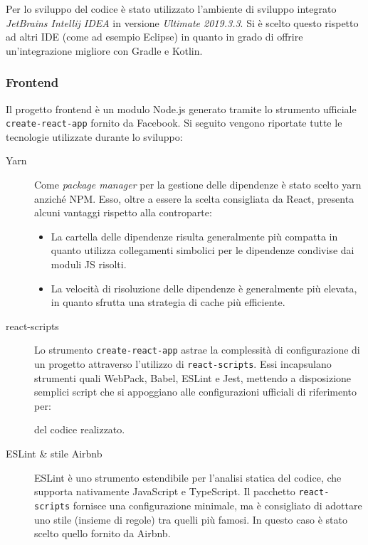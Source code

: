       Per lo sviluppo del codice è stato utilizzato l'ambiente di sviluppo integrato \emph{JetBrains Intellij IDEA} in versione \emph{Ultimate 2019.3.3}.
      Si è scelto questo rispetto ad altri IDE (come ad esempio Eclipse) in quanto in grado di offrire un'integrazione migliore con Gradle e Kotlin.

    \subsubsection{Frontend}

      Il progetto frontend è un modulo Node.js generato tramite lo strumento ufficiale \texttt{create-react-app} fornito da Facebook.
      Si seguito vengono riportate tutte le tecnologie utilizzate durante lo sviluppo:

      \begin{description}
        \item[Yarn]
          Come \emph{package manager} per la gestione delle dipendenze è stato scelto yarn anziché NPM\@.
          Esso, oltre a essere la scelta consigliata da React, presenta alcuni vantaggi rispetto alla controparte:
          \begin{itemize}
            \item La cartella delle dipendenze risulta generalmente più compatta in quanto utilizza collegamenti simbolici per le dipendenze condivise dai moduli JS risolti.
            \item La velocità di risoluzione delle dipendenze è generalmente più elevata, in quanto sfrutta una strategia di cache più efficiente.
          \end{itemize}

        \item[react-scripts]
          Lo strumento \texttt{create-react-app} astrae la complessità di configurazione di un progetto attraverso l'utilizzo di \texttt{react-scripts}.
          Essi incapsulano strumenti quali WebPack, Babel, ESLint e Jest, mettendo a disposizione semplici script che si appoggiano alle configurazioni ufficiali di riferimento per:
          del codice realizzato.

        \item[ESLint \& stile Airbnb]
          ESLint è uno strumento estendibile per l'analisi statica del codice, che supporta nativamente JavaScript e TypeScript.
          Il pacchetto \texttt{react-scripts} fornisce una configurazione minimale, ma è consigliato di adottare uno stile (insieme di regole) tra quelli più famosi.
          In questo caso è stato scelto quello fornito da Airbnb. %


\end{description}
